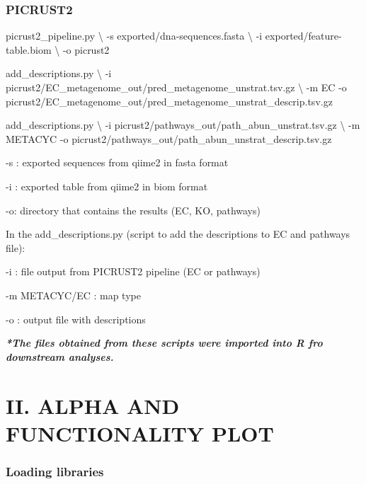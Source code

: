 \documentclass[]{interact}
\theoremstyle{plain}%
\theoremstyle{definition}
\theoremstyle{remark}
\newenvironment{Shaded}{\begin{snugshade}}{\end{snugshade}}
\newcommand{\AttributeTok}[1]{\textcolor[rgb]{0.77,0.63,0.00}{#1}}
\newcommand{\DataTypeTok}[1]{\textcolor[rgb]{0.13,0.29,0.53}{#1}}
\newcommand{\ExtensionTok}[1]{#1}
\newcommand{\NormalTok}[1]{#1}
\begin{document}
\hypertarget{picrust2}{%
\subsubsection{PICRUST2}\label{picrust2}}

\begin{Shaded}
\begin{Highlighting}[]
\ExtensionTok{picrust2\_pipeline.py} \DataTypeTok{\textbackslash{}}
\NormalTok{{-}s exported/dna{-}sequences.fasta }\DataTypeTok{\textbackslash{}}
\NormalTok{{-}i exported/feature{-}table.biom }\DataTypeTok{\textbackslash{}}
\NormalTok{{-}o picrust2 }


\ExtensionTok{add\_descriptions.py} \DataTypeTok{\textbackslash{}}
\NormalTok{{-}i picrust2/EC\_metagenome\_out/pred\_metagenome\_unstrat.tsv.gz }\DataTypeTok{\textbackslash{}}
\NormalTok{{-}m EC }\AttributeTok{{-}o}\NormalTok{ picrust2/EC\_metagenome\_out/pred\_metagenome\_unstrat\_descrip.tsv.gz}

\ExtensionTok{add\_descriptions.py} \DataTypeTok{\textbackslash{}}
\NormalTok{{-}i picrust2/pathways\_out/path\_abun\_unstrat.tsv.gz }\DataTypeTok{\textbackslash{}}
\NormalTok{{-}m METACYC }\AttributeTok{{-}o}\NormalTok{ picrust2/pathways\_out/path\_abun\_unstrat\_descrip.tsv.gz}
\end{Highlighting}
\end{Shaded}

-s : exported sequences from qiime2 in fasta format

-i : exported table from qiime2 in biom format

-o: directory that contains the results (EC, KO, pathways)

In the add\_descriptions.py (script to add the descriptions to EC and
pathways file):

-i : file output from PICRUST2 pipeline (EC or pathways)

-m METACYC/EC : map type

-o : output file with descriptions

\textbf{\emph{*The files obtained from these scripts were imported into
R fro downstream analyses.}}

\hypertarget{ii.-alpha-and-functionality-plot}{%
\section{II. ALPHA AND FUNCTIONALITY
PLOT}\label{ii.-alpha-and-functionality-plot}}

\hypertarget{loading-libraries}{%
\subsubsection{Loading libraries}\label{loading-libraries}}
\end{document}
